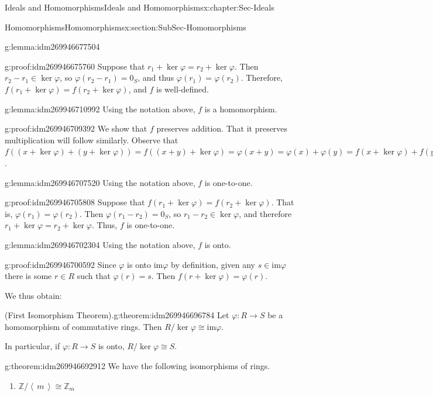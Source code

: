 \documentclass[oneside,10pt,]{book}
\numberwithin{equation}{section}
\newcommand{\ideal}[1]{\left\langle\, #1 \,\right\rangle}
\def\p{\varphi}
\def\im{\text{im}}
\def\Z{{\mathbb Z}}
\begin{document}
\begin{chapterptx}{Ideals and Homomorphisms}{}{Ideals and Homomorphisms}{}{}{x:chapter:Sec-Ideals}
\begin{sectionptx}{Homomorphisms}{}{Homomorphisms}{}{}{x:section:SubSec-Homomorphisms}
\begin{lemma}{}{}{g:lemma:idm269946677504}
\end{lemma}
\begin{proofptx}{}{g:proof:idm269946675760}
Suppose that \(r_1 + \ker\p = r_2 + \ker\p\). Then \(r_2-r_1 \in \ker\p\), so \(\p(r_2-r_1) = 0_S\), and thus \(\p(r_1) = \p(r_2)\). Therefore, \(f(r_1+\ker\p) = f(r_2+\ker\p)\), and \(f\) is well-defined.%
\end{proofptx}
\begin{lemma}{}{}{g:lemma:idm269946710992}%
Using the notation above, \(f\) is a homomorphism.%
\end{lemma}
\begin{proofptx}{}{g:proof:idm269946709392}
We show that \(f\) preserves addition. That it preserves multiplication will follow similarly. Observe that \(f((x+\ker\p) + (y+\ker\p)) = f((x+y)+\ker\p) = \p(x+y) = \p(x)+\p(y) = f(x+\ker\p) + f(y+\ker\p)\).%
\end{proofptx}
\begin{lemma}{}{}{g:lemma:idm269946707520}%
Using the notation above, \(f\) is one-to-one.%
\end{lemma}
\begin{proofptx}{}{g:proof:idm269946705808}
Suppose that \(f(r_1 + \ker\p) = f(r_2 + \ker\p)\). That is, \(\p(r_1) = \p(r_2)\). Then \(\p(r_1 - r_2) = 0_S\), so \(r_1 -r_2 \in \ker\p\), and therefore \(r_1 + \ker\p = r_2 + \ker \p\). Thus, \(f\) is one-to-one.%
\end{proofptx}
\begin{lemma}{}{}{g:lemma:idm269946702304}%
Using the notation above, \(f\) is onto.%
\end{lemma}
\begin{proofptx}{}{g:proof:idm269946700592}
Since \(\p\) is onto \(\im \p\) by definition, given any \(s\in \im \p\) there is some \(r\in R\) such that \(\p(r) = s\). Then \(f(r+\ker\p) = \p(r)\).%
\end{proofptx}
We thus obtain:%
\begin{theorem}{(First Isomorphism Theorem).}{}{g:theorem:idm269946696784}%
Let \(\p : R\to S\) be a homomorphism of commutative rings. Then \(R/\ker \p \cong \im \p\).%
\par
In particular, if \(\p : R\to S\) is onto, \(R/\ker \p \cong S\).%
\end{theorem}
\begin{theorem}{}{}{g:theorem:idm269946692912}%
We have the following isomorphisms of rings.%
\begin{enumerate}
\item{}\(\Z/\ideal{m} \cong \Z_m\)%

\end{enumerate}
\end{theorem}
\end{sectionptx}
\end{chapterptx}
\end{document}
